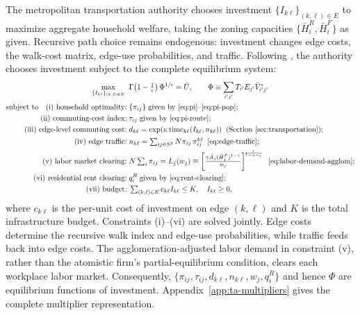 \documentclass[12pt, a4paper]{article}
\theoremstyle{definition}
\theoremstyle{remark}
\begin{document}
The metropolitan transportation authority chooses investment $\{I_{k\ell}\}_{(k,\ell) \in E}$ to maximize aggregate household welfare, taking the zoning capacities $\{\bar H_i^R,\bar H_i^F\}$ as given. Recursive path choice remains endogenous: investment changes edge costs, the walk-cost matrix, edge-use probabilities, and traffic. Following \citet{Bordeu2026-df}, the authority chooses investment subject to the complete equilibrium system:
\begin{align}
    \label{eq:TA-problem}
\max_{\{I_{k\ell}\}_{(k,\ell)\in E}}\;\; & \Gamma\!\left(1 - \tfrac{1}{\epsilon}\right)\Phi^{1/\epsilon} = \bar U, \qquad \Phi\equiv\sum_{i'j'}T_{i'}E_{j'}\tilde V_{i'j'}^\epsilon \\
\text{subject to} \quad
\text{(i) household optimality:}\; & \{\pi_{ij}\}\; \text{given by \eqref{eq:pi}--\eqref{eq:pi-pop};} \nonumber\\
\text{(ii) commuting-cost index:}\; & \tau_{ij} \;\text{given by \eqref{eq:pi-route};} \nonumber\\
\text{(iii) edge-level commuting cost:}\; & d_{k\ell} = \exp(\kappa\,\mathrm{time}_{k\ell}(I_{k\ell},n_{k\ell})) \;\;(\text{Section~\ref{sec:transportation}}); \nonumber\\
\text{(iv) edge traffic:}\; & n_{k\ell} = \textstyle\sum_{ij\in S^2} N\pi_{ij}\,\pi_{ij}^{k\ell} \;\;\eqref{eq:edge-traffic}; \nonumber\\
\text{(v) labor market clearing:}\; &
N\textstyle\sum_i \pi_{ij}
=
L_j(w_j)
\equiv
\left[
\frac{\gamma\bar A_j(\bar H_j^F)^{1-\gamma}}{w_j}
\right]^{\!\frac{1}{1-\gamma-\zeta}}
\;\;\eqref{eq:labor-demand-agglom}; \nonumber\\
\text{(vi) residential rent clearing:}\; & q_i^R \;\text{given by \eqref{eq:rent-clearing}}; \nonumber\\
\text{(vii) budget:}\; & \textstyle\sum_{(k,\ell)\in E}c_{k\ell}I_{k\ell}\leq K, \quad I_{k\ell}\geq0, \nonumber
\end{align}
where $c_{k\ell}$ is the per-unit cost of investment on edge $(k,\ell)$ and $K$ is the total infrastructure budget. Constraints (i)--(vi) are solved jointly. Edge costs determine the recursive walk index and edge-use probabilities, while traffic feeds back into edge costs. The agglomeration-adjusted labor demand in constraint (v), rather than the atomistic firm's partial-equilibrium condition, clears each workplace labor market. Consequently, $\{\pi_{ij},\tau_{ij},d_{k\ell},n_{k\ell},w_j,q_i^R\}$ and hence $\Phi$ are equilibrium functions of investment. Appendix~\ref{app:ta-multipliers} gives the complete multiplier representation.
\end{document}
